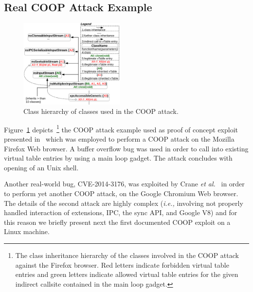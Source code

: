 \subsection{Real COOP Attack Example}
\label{Real COOP Attack Example}
\label{Running Example: CVE X}
\begin{figure}[h!]
    \centering
    \includegraphics[width=0.47\textwidth]{figures/class_hierarchy.pdf}
\caption{Class hierarchy of classes used in the COOP attack.}
\label{Class exploit}
\vspace{-.29cm}
\end{figure}
Figure~\ref{Class exploit} depicts~\footnote{The class inheritance hierarchy of the classes involved in the COOP attack against the Firefox browser. Red letters 
indicate forbidden virtual table entries and green letters indicate allowed virtual table entries for the given indirect callsite
contained in the main loop gadget.}
the COOP attack example used as proof of concept exploit presented in~\cite{schuster:coop} which was employed to 
perform a COOP attack on the Mozilla Firefox Web browser. A buffer overflow bug was used in order to call into existing virtual table 
entries by using a main loop gadget. The attack concludes with opening of an Unix shell. 

Another real-world bug, CVE-2014-3176, was exploited by Crane \textit{et al.}~\cite{crane:readactor++} in order to perform yet another 
COOP attack, on the Google Chromium Web browser. The details of the second attack are highly complex (\textit{i.e.,} involving not properly 
handled interaction of extensions, IPC, the sync API, and Google V8) and for this reason we briefly present next the first 
documented COOP exploit on a Linux machine.

